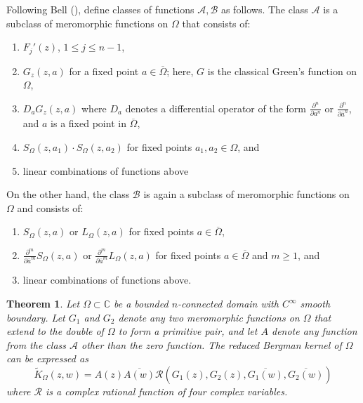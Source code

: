 \documentclass[11pt, reqno]{amsart}
\newtheorem{thm}{Theorem}[section]
\numberwithin{equation}{section}
\begin{document}
\medskip

Following Bell (\cite{Be1}), define classes of functions $\mathcal{A}, \mathcal B$ as follows. The class $\mathcal A$ is a subclass of meromorphic functions on $\Omega$ that consists of: 
\begin{enumerate}
    \item[(i)] $F_j'(z)$, $1 \le j \le n-1$, 
    \item[(ii)] $G_z(z,a)$ for a fixed point $a\in\overline{\Omega}$; here, $G$ is the classical Green's function on $\Omega$,
    \item[(iii)] $D_a G_z(z,a)$ where $D_a$ denotes a differential operator of the form $\frac{\partial^n}{\partial a^n}$ or $\frac{\partial^n}{\partial \bar{a}^n}$, and $a$ is a fixed point in $\overline{\Omega}$,
    \item[(iv)] $S_{\Omega}(z,a_1)\cdot S_{\Omega}(z,a_2)$ for fixed points $a_1,a_2\in\Omega$, and
    \item[(v)] linear combinations of functions above
\end{enumerate}

On the other hand, the class $\mathcal B$ is again a subclass of meromorphic functions on $\Omega$ and consists of:

\begin{enumerate}
    \item[(i)] $S_{\Omega}(z,a)$ or $L_{\Omega}(z,a)$ for fixed points $a\in\overline{\Omega}$,
    \item[(ii)] $\frac{\partial^m}{\partial\overline{a}^m}S_{\Omega}(z,a)$ or $\frac{\partial^m}{\partial\overline{a}^m}L_{\Omega}(z,a)$ for fixed points $a\in\overline{\Omega}$ and $m \ge 1$, and
    \item[(iii)] linear combinations of functions above.
\end{enumerate}

\begin{thm}\label{reduced kernel}
Let $\Omega\subset\mathbb{C}$ be a bounded $n$-connected domain with $C^{\infty}$ smooth boundary. Let $G_1$ and $G_2$ denote any two meromorphic functions on $\Omega$ that extend to the double of $\Omega$ to form a primitive pair, and let $A$ denote any function from the class $\mathcal{A}$ other than the zero function. The reduced Bergman kernel of $\Omega$ can be expressed as 
\[
\tilde{K}_{\Omega}(z,w)=
A(z)\overline{A(w)} \mathcal{R}(G_1(z),G_2(z),\overline{G_1(w)},\overline{G_2(w)})
\]
where $\mathcal{R}$ is a complex rational function of four complex variables.
\end{thm}
\end{document}
